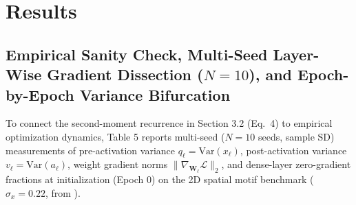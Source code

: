 \documentclass[11pt, a4paper]{article}
\begin{document}
\section{Results}

\subsection{Empirical Sanity Check, Multi-Seed Layer-Wise Gradient Dissection ($N=10$), and Epoch-by-Epoch Variance Bifurcation}
To connect the second-moment recurrence in Section 3.2 (Eq.\ 4) to empirical optimization dynamics, Table 5 reports multi-seed ($N = 10$ seeds, sample SD) measurements of pre-activation variance $q_{\ell} = \text{Var}(x_{\ell})$, post-activation variance $v_{\ell} = \text{Var}(a_{\ell})$, weight gradient norms $\|\nabla_{\mathbf{W}_{\ell}}\mathcal{L}\|_{2}$, and dense-layer zero-gradient fractions at initialization (Epoch 0) on the 2D spatial motif benchmark ($\sigma_{x} = 0.22$, from ).
\end{document}
